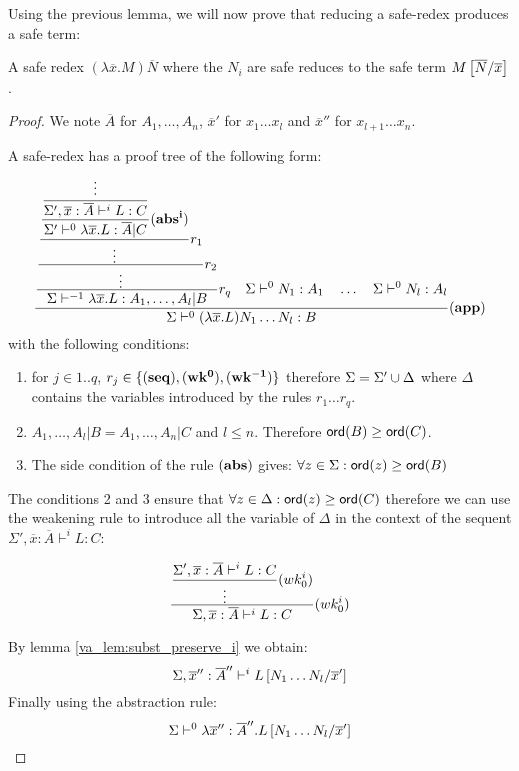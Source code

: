 

Using the previous lemma, we will now prove that reducing a
safe-redex produces a safe term:

\begin{lem}
\label{va_lem:safereduction} A safe redex $(\lambda \overline{x} . M )
\overline{N}$ where the $N_i$ are safe reduces to the safe term
$M\left[ \overline{N}/\overline{x} \right]$.
\end{lem}

\begin{proof}

We note $\overline{A}$ for $A_1, \ldots , A_n$, $\overline{x}'$ for
$x_1 \ldots x_l$ and $\overline{x}''$ for $x_{l+1} \ldots x_n$.

A safe-redex has a proof tree of the following form:
$$
   \frac{\displaystyle 
        \frac{\displaystyle 
            \frac{\displaystyle 
                \frac{\displaystyle 
                    \frac{\displaystyle  \frac{\displaystyle \vdots}{\Sigma',\overline{x}:\overline{A}\vdash^i L:C  }
                        }{\Sigma' \vdash^0 \lambda \overline{x} . L : \overline{A}|C} \mathbf{(abs^i)}
                }{\vdots} r_1
            }{\vdots} r_2
            }{ \Sigma \vdash^{-1} \lambda \overline{x} . L : A_1, \ldots , A_l|B} r_q
            \quad
            \Sigma \vdash^0 N_1 : A_1
            \quad \ldots \quad \Sigma \vdash^0 N_l : A_l
    }{
       \Sigma \vdash^0 (\lambda \overline{x} . L) N_1 \ldots N_l : B
    } (\mathbf{app})
$$
with the following conditions:
\begin{enumerate}
\item for $j\in 1..q$, $r_j \in \{ \mathbf{(seq)}, \mathbf{(wk^0)}, \mathbf{(wk^{-1})} \}$ therefore
$\Sigma = \Sigma' \cup \Delta$ where $\Delta$ contains the
variables introduced by the rules $r_1 \ldots r_q$.

\item $A_1, \ldots , A_l|B = A_1, \ldots , A_n|C$ and $l\leq n$. Therefore
${\sf ord}(B) \geq {\sf ord}(C)$.
\item The side condition of the rule $\mathbf{(abs)}$ gives: $\forall z \in \Sigma : {\sf ord}(z) \geq {\sf ord}(B)$
\end{enumerate}


The conditions 2 and 3 ensure that $\forall z \in \Delta : {\sf ord}(z)
\geq {\sf ord}(C)$ therefore we can use the weakening rule to introduce
all the variable of $\Delta$ in the context of the sequent
$\Sigma',\overline{x}:\overline{A}\vdash^i L:C$:

$$\frac{\displaystyle \frac{\displaystyle  \Sigma',\overline{x}:\overline{A}\vdash^i L:C  }{\vdots} (wk^i_0)}{\Sigma,\overline{x}:\overline{A}\vdash^i L:C} (wk^i_0)
$$

By lemma \ref{va_lem:subst_preserve_i} we obtain:
$$ \Sigma, \overline{x}'':\overline{A}'' \vdash^i L\left[ N_1 \ldots N_l/\overline{x}' \right]$$
Finally using the abstraction rule:
$$ \Sigma \vdash^0 \lambda \overline{x}'':\overline{A}'' . L\left[ N_1 \ldots N_l/\overline{x}' \right]$$
\end{proof}



